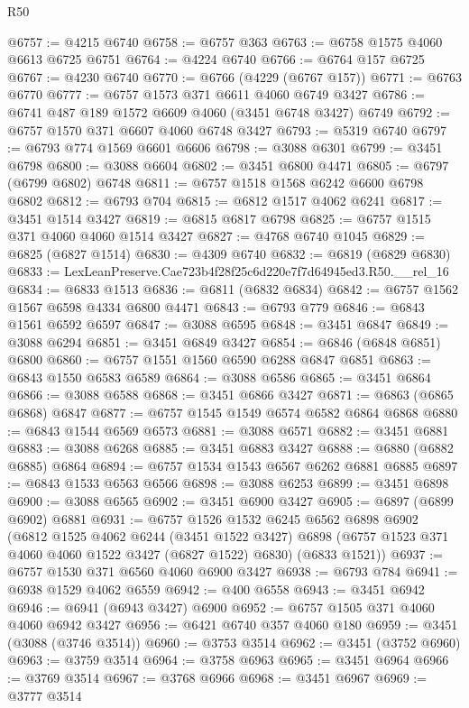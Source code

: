 \begin{lexlean}{R50}
\begin{coremodule}
@6757 := @4215 @6740
@6758 := @6757 @363
@6763 := @6758 @1575 @4060 @6613 @6725 @6751
@6764 := @4224 @6740
@6766 := @6764 @157 @6725
@6767 := @4230 @6740
@6770 := @6766 (@4229 (@6767 @157))
@6771 := @6763 @6770
@6777 := @6757 @1573 @371 @6611 @4060 @6749 @3427
@6786 := @6741 @487 @189 @1572 @6609 @4060 (@3451 @6748 @3427) @6749
@6792 := @6757 @1570 @371 @6607 @4060 @6748 @3427
@6793 := @5319 @6740
@6797 := @6793 @774 @1569 @6601 @6606
@6798 := @3088 @6301
@6799 := @3451 @6798
@6800 := @3088 @6604
@6802 := @3451 @6800 @4471
@6805 := @6797 (@6799 @6802) @6748
@6811 := @6757 @1518 @1568 @6242 @6600 @6798 @6802
@6812 := @6793 @704
@6815 := @6812 @1517 @4062 @6241
@6817 := @3451 @1514 @3427
@6819 := @6815 @6817 @6798
@6825 := @6757 @1515 @371 @4060 @4060 @1514 @3427
@6827 := @4768 @6740 @1045
@6829 := @6825 (@6827 @1514)
@6830 := @4309 @6740
@6832 := @6819 (@6829 @6830)
@6833 := LexLeanPreserve.Cae723b4f28f25c6d220e7f7d64945ed3.R50.__rel_16
@6834 := @6833 @1513
@6836 := @6811 (@6832 @6834)
@6842 := @6757 @1562 @1567 @6598 @4334 @6800 @4471
@6843 := @6793 @779
@6846 := @6843 @1561 @6592 @6597
@6847 := @3088 @6595
@6848 := @3451 @6847
@6849 := @3088 @6294
@6851 := @3451 @6849 @3427
@6854 := @6846 (@6848 @6851) @6800
@6860 := @6757 @1551 @1560 @6590 @6288 @6847 @6851
@6863 := @6843 @1550 @6583 @6589
@6864 := @3088 @6586
@6865 := @3451 @6864
@6866 := @3088 @6588
@6868 := @3451 @6866 @3427
@6871 := @6863 (@6865 @6868) @6847
@6877 := @6757 @1545 @1549 @6574 @6582 @6864 @6868
@6880 := @6843 @1544 @6569 @6573
@6881 := @3088 @6571
@6882 := @3451 @6881
@6883 := @3088 @6268
@6885 := @3451 @6883 @3427
@6888 := @6880 (@6882 @6885) @6864
@6894 := @6757 @1534 @1543 @6567 @6262 @6881 @6885
@6897 := @6843 @1533 @6563 @6566
@6898 := @3088 @6253
@6899 := @3451 @6898
@6900 := @3088 @6565
@6902 := @3451 @6900 @3427
@6905 := @6897 (@6899 @6902) @6881
@6931 := @6757
    @1526
    @1532
    @6245
    @6562
    @6898
    @6902
    (@6812
      @1525
      @4062
      @6244
      (@3451 @1522 @3427)
      @6898
      (@6757 @1523 @371 @4060 @4060 @1522 @3427 (@6827 @1522) @6830)
      (@6833 @1521))
@6937 := @6757 @1530 @371 @6560 @4060 @6900 @3427
@6938 := @6793 @784
@6941 := @6938 @1529 @4062 @6559
@6942 := @400 @6558
@6943 := @3451 @6942
@6946 := @6941 (@6943 @3427) @6900
@6952 := @6757 @1505 @371 @4060 @4060 @6942 @3427
@6956 := @6421 @6740 @357 @4060 @180
@6959 := @3451 (@3088 (@3746 @3514))
@6960 := @3753 @3514
@6962 := @3451 (@3752 @6960)
@6963 := @3759 @3514
@6964 := @3758 @6963
@6965 := @3451 @6964
@6966 := @3769 @3514
@6967 := @3768 @6966
@6968 := @3451 @6967
@6969 := @3777 @3514

\end{coremodule}
\end{lexlean}
